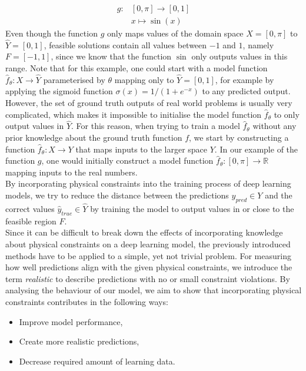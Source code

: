 \begin{equation}
\label{example_fn}
\begin{aligned}
g: &[0, \pi] \to [0, 1]\\
&x \mapsto \sin(x)
\end{aligned}
\end{equation}
Even though the function $g$ only maps values of the domain space $X = [0, \pi]$ to $\hat{Y} = [0, 1]$, feasible solutions contain all values between $-1$ and $1$, namely $F = [-1, 1]$, since we know that the function $\sin$ only outputs values in this range. Note that for this example, one could start with a model function $\hat{f}_\theta: X \to \hat{Y}$ parameterised by $\theta$ mapping only to $\hat{Y} = [0, 1]$, for example by applying the sigmoid function $\sigma(x) = 1 / (1 + e^{-x})$ to any predicted output. However, the set of ground truth outputs of real world problems is usually very complicated, which makes it impossible to initialise the model function $\hat{f}_\theta$ to only output values in $\hat{Y}$. For this reason, when trying to train a model $\hat{f}_\theta$ without any prior knowledge about the ground truth function $f$, we start by constructing a function $\hat{f}_\theta: X \to Y$ that maps inputs to the larger space $Y$. In our example of the function $g$, one would initially construct a model function $\hat{f}_\theta: [0, \pi] \to \mathbb{R}$ mapping inputs to the real numbers.\\
\indent By incorporating physical constraints into the training process of deep learning models, we try to reduce the distance between the predictions $y_{pred} \in Y$ and the correct values $\hat{y}_{true} \in \hat{Y}$ by training the model to output values in or close to the feasible region $F$.\\
\indent Since it can be difficult to break down the effects of incorporating knowledge about physical constraints on a deep learning model, the previously introduced methods have to be applied to a simple, yet not trivial problem. For measuring how well predictions align with the given physical constraints, we introduce the term \textit{realistic} to describe predictions with no or small constraint violations. By analysing the behaviour of our model, we aim to show that incorporating physical constraints contributes in the following ways:
\begin{itemize}
	\item Improve model performance,
	\item Create more realistic predictions,
	\item Decrease required amount of learning data.
\end{itemize}
